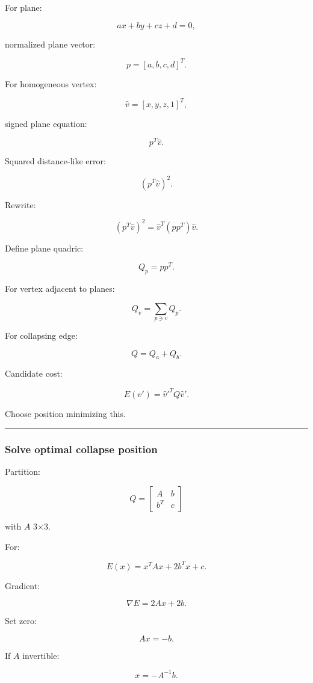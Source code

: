 For plane:

\[
ax+by+cz+d=0,
\]

normalized plane vector:

\[
p=
[a,b,c,d]^T.
\]

For homogeneous vertex:

\[
\hat v=
[x,y,z,1]^T,
\]

signed plane equation:

\[
p^T\hat v.
\]

Squared distance-like error:

\[
(p^T\hat v)^2.
\]

Rewrite:

\[
\boxed{
(p^T\hat v)^2
=
\hat v^T
(pp^T)
\hat v.
}
\]

Define plane quadric:

\[
Q_p=pp^T.
\]

For vertex adjacent to planes:

\[
\boxed{
Q_v=
\sum_{p\ni v}
Q_p.
}
\]

For collapsing edge:

\[
Q=
Q_a+Q_b.
\]

Candidate cost:

\[
\boxed{
E(v')
=
\hat v'^TQ\hat v'.
}
\]

Choose position minimizing this.

\begin{center}\rule{0.5\linewidth}{0.5pt}\end{center}

\subsubsection{Solve optimal collapse position}\label{solve-optimal-collapse-position}

Partition:

\[
Q=
\begin{bmatrix}
A&b\\
b^T&c
\end{bmatrix}
\]

with \(A\) 3×3.

For:

\[
E(x)=x^TAx+2b^Tx+c.
\]

Gradient:

\[
\nabla E=
2Ax+2b.
\]

Set zero:

\[
\boxed{
Ax=-b.
}
\]

If \(A\) invertible:

\[
x=-A^{-1}b.
\]

